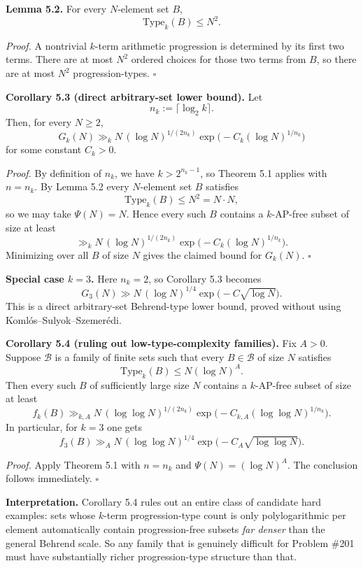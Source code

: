\medskip
\noindent\textbf{Lemma 5.2.}
For every $N$-element set $B$,
\[
\mathrm{Type}_k(B)\le N^2.
\]

\smallskip
\noindent\emph{Proof.}
A nontrivial $k$-term arithmetic progression is determined by its first two terms.  There are at most $N^2$ ordered choices for those two terms from $B$, so there are at most $N^2$ progression-types. \hfill$\square$

\medskip
\noindent\textbf{Corollary 5.3 (direct arbitrary-set lower bound).}
Let
\[
n_k:=\lceil \log_2 k\rceil.
\]
Then, for every $N\ge 2$,
\[
G_k(N)\gg_k N\, (\log N)^{1/(2n_k)}
\exp\!\bigl(-C_k(\log N)^{1/n_k}\bigr)
\]
for some constant $C_k>0$.

\smallskip
\noindent\emph{Proof.}
By definition of $n_k$, we have $k>2^{n_k-1}$, so Theorem 5.1 applies with $n=n_k$.
By Lemma 5.2 every $N$-element set $B$ satisfies
\[
\mathrm{Type}_k(B)\le N^2=N\cdot N,
\]
so we may take $\Psi(N)=N$.  Hence every such $B$ contains a $k$-AP-free subset of size at least
\[
\gg_k N\, (\log N)^{1/(2n_k)}
\exp\!\bigl(-C_k(\log N)^{1/n_k}\bigr).
\]
Minimizing over all $B$ of size $N$ gives the claimed bound for $G_k(N)$. \hfill$\square$

\medskip
\noindent\textbf{Special case $k=3$.}
Here $n_k=2$, so Corollary 5.3 becomes
\[
G_3(N)\gg N\, (\log N)^{1/4}\exp\!\bigl(-C\sqrt{\log N}\bigr).
\]
This is a direct arbitrary-set Behrend-type lower bound, proved without using Koml\'os--Sulyok--Szemer\'edi.

\medskip
\noindent\textbf{Corollary 5.4 (ruling out low-type-complexity families).}
Fix $A>0$.  Suppose $\mathcal B$ is a family of finite sets such that every $B\in \mathcal B$ of size $N$ satisfies
\[
\mathrm{Type}_k(B)\le N(\log N)^A.
\]
Then every such $B$ of sufficiently large size $N$ contains a $k$-AP-free subset of size at least
\[
f_k(B)\gg_{k,A} N\, (\log\log N)^{1/(2n_k)}
\exp\!\bigl(-C_{k,A}(\log\log N)^{1/n_k}\bigr).
\]
In particular, for $k=3$ one gets
\[
f_3(B)\gg_A N\, (\log\log N)^{1/4}
\exp\!\bigl(-C_A\sqrt{\log\log N}\bigr).
\]

\smallskip
\noindent\emph{Proof.}
Apply Theorem 5.1 with $n=n_k$ and $\Psi(N)=(\log N)^A$.
The conclusion follows immediately. \hfill$\square$

\medskip
\noindent\textbf{Interpretation.}
Corollary 5.4 rules out an entire class of candidate hard examples: sets whose $k$-term progression-type count is only polylogarithmic per element automatically contain progression-free subsets \emph{far denser} than the general Behrend scale.  So any family that is genuinely difficult for Problem \#201 must have substantially richer progression-type structure than that.

